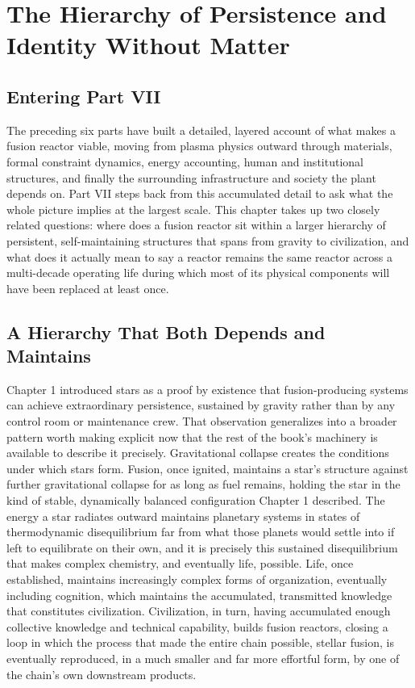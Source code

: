 \chapter{The Hierarchy of Persistence and Identity Without Matter}

\section{Entering Part VII}

The preceding six parts have built a detailed, layered account of what makes a fusion reactor viable, moving from plasma physics outward through materials, formal constraint dynamics, energy accounting, human and institutional structures, and finally the surrounding infrastructure and society the plant depends on. Part VII steps back from this accumulated detail to ask what the whole picture implies at the largest scale. This chapter takes up two closely related questions: where does a fusion reactor sit within a larger hierarchy of persistent, self-maintaining structures that spans from gravity to civilization, and what does it actually mean to say a reactor remains the same reactor across a multi-decade operating life during which most of its physical components will have been replaced at least once.

\section{A Hierarchy That Both Depends and Maintains}

Chapter 1 introduced stars as a proof by existence that fusion-producing systems can achieve extraordinary persistence, sustained by gravity rather than by any control room or maintenance crew. That observation generalizes into a broader pattern worth making explicit now that the rest of the book's machinery is available to describe it precisely. Gravitational collapse creates the conditions under which stars form. Fusion, once ignited, maintains a star's structure against further gravitational collapse for as long as fuel remains, holding the star in the kind of stable, dynamically balanced configuration Chapter 1 described. The energy a star radiates outward maintains planetary systems in states of thermodynamic disequilibrium far from what those planets would settle into if left to equilibrate on their own, and it is precisely this sustained disequilibrium that makes complex chemistry, and eventually life, possible. Life, once established, maintains increasingly complex forms of organization, eventually including cognition, which maintains the accumulated, transmitted knowledge that constitutes civilization. Civilization, in turn, having accumulated enough collective knowledge and technical capability, builds fusion reactors, closing a loop in which the process that made the entire chain possible, stellar fusion, is eventually reproduced, in a much smaller and far more effortful form, by one of the chain's own downstream products.

